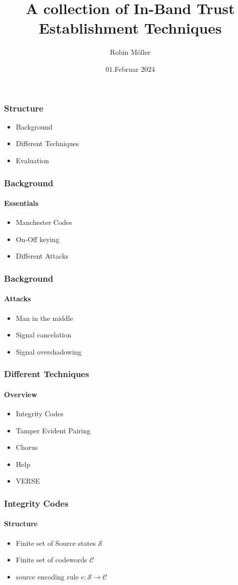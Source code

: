 \documentclass{beamer}
\title{A collection of In-Band Trust Establishment Techniques}
\author{Robin Möller}
\institute[]{Technical University Munich}
\date[01.02.2024]{01.Februar 2024}
\begin{document}
\begin{frame}
\titlepage
\end{frame}

\begin{frame}
\frametitle{Structure}
\begin{itemize}
	\item Background
	\item Different Techniques
	\item Evaluation
\end{itemize}
\end{frame}

\begin{frame}
	\frametitle{Background}
	\framesubtitle{Essentials}
	\begin{itemize}
		\item Manchester Codes
		\item On-Off keying
		\item Different Attacks
	\end{itemize}
\end{frame}

\begin{frame}
	\frametitle{Background}
	\framesubtitle{Attacks}
	\begin{itemize}
		\item Man in the middle
		\item Signal cancelation
		\item Signal overshadowing
	\end{itemize}
\end{frame}

\begin{frame}
	\frametitle{Different Techniques}
	\framesubtitle{Overview}
	\begin{itemize}
		\item Integrity Codes
		\item Tamper Evident Pairing
		\item Chorus
		\item Help
		\item VERSE
	\end{itemize}
\end{frame}

\begin{frame}
	\frametitle{Integrity Codes}
	\framesubtitle{Structure}
	\begin{itemize}
		\item Finite set of Source states $\mathcal{S}$
		\item Finite set of codewords $\mathcal{C}$
		\item source encoding rule $e: \mathcal{S}\rightarrow\mathcal{C}$
	\end{itemize}
\end{frame}
\end{document}
